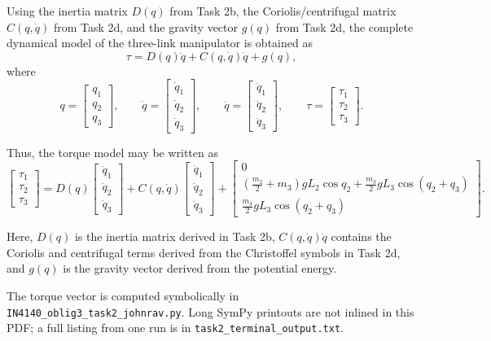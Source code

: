 \documentclass{article}
\begin{document}
Using the inertia matrix \(D(q)\) from Task 2b, the Coriolis/centrifugal matrix \(C(q,\dot q)\) from Task 2d, and the gravity vector \(g(q)\) from Task 2d, the complete dynamical model of the three-link manipulator is obtained as
\[
\tau = D(q)\ddot q + C(q,\dot q)\dot q + g(q),
\]
where
\[
q=
\begin{bmatrix}
q_1\\
q_2\\
q_3
\end{bmatrix},
\qquad
\dot q=
\begin{bmatrix}
\dot q_1\\
\dot q_2\\
\dot q_3
\end{bmatrix},
\qquad
\ddot q=
\begin{bmatrix}
\ddot q_1\\
\ddot q_2\\
\ddot q_3
\end{bmatrix},
\qquad
\tau=
\begin{bmatrix}
\tau_1\\
\tau_2\\
\tau_3
\end{bmatrix}.
\]

Thus, the torque model may be written as
\[
\begin{bmatrix}
\tau_1\\
\tau_2\\
\tau_3
\end{bmatrix}
=
D(q)
\begin{bmatrix}
\ddot q_1\\
\ddot q_2\\
\ddot q_3
\end{bmatrix}
+
C(q,\dot q)
\begin{bmatrix}
\dot q_1\\
\dot q_2\\
\dot q_3
\end{bmatrix}
+
\begin{bmatrix}
0\\[6pt]
\left(\frac{m_2}{2}+m_3\right)gL_2\cos q_2
+\frac{m_3}{2}gL_3\cos(q_2+q_3)\\[8pt]
\frac{m_3}{2}gL_3\cos(q_2+q_3)
\end{bmatrix}.
\]

Here, \(D(q)\) is the inertia matrix derived in Task 2b, \(C(q,\dot q)\dot q\) contains the Coriolis and centrifugal terms derived from the Christoffel symbols in Task 2d, and \(g(q)\) is the gravity vector derived from the potential energy.

The torque vector is computed symbolically in \texttt{IN4140\_oblig3\_task2\_johnrav.py}. Long SymPy printouts are not inlined in this PDF; a full listing from one run is in \texttt{task2\_terminal\_output.txt}.
\end{document}
